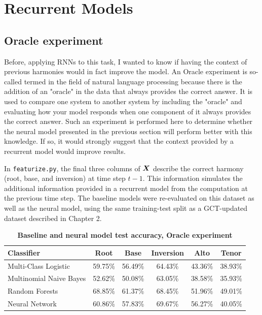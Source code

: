 \documentclass[11pt]{article}
\begin{document}
\section{Recurrent Models}

\subsection{Oracle experiment}

Before, applying RNNs to this task, I wanted to know if having the context of previous harmonies would in fact improve the model. An Oracle experiment is so-called termed in the field of natural language processing because there is the addition of an "oracle" in the data that always provides the correct answer. It is used to compare one system to another system by including the "oracle" and evaluating how your model responds when one component of it always provides the correct answer. Such an experiment is performed here to determine whether the neural model presented in the previous section will perform better with this knowledge. If so, it would strongly suggest that the context provided by a recurrent model would improve results.

In \texttt{featurize.py}, the final three columns of $\boldsymbol{X}$ describe the correct harmony (root, base, and inversion) at time step $t-1$. This information simulates the additional information provided in a recurrent model from the computation at the previous time step. The baseline models were re-evaluated on this dataset as well as the neural model, using the same training-test split as a GCT-updated dataset described in Chapter 2.

\begin{table}[h]
\begin{center}
\caption[Table caption text]{\textbf{Baseline and neural model test accuracy, Oracle experiment}}
\begin{tabular}{l *{5}{c}}
Classifier & Root & Base & Inversion & Alto & Tenor \\ \hline
Multi-Class Logistic & 59.75\% & 56.49\% & 64.43\% & 43.36\% & 38.93\% \\
Multinomial Naive Bayes & 52.62\% & 50.08\% & 63.05\% & 38.58\% & 35.93\% \\
Random Forests & 68.85\% & 61.37\% & 68.45\% & 51.96\% & 49.01\% \\ \hline
Neural Network & 60.86\% & 57.83\% & 69.67\% & 56.27\% & 40.05\% \\
\end{tabular}
\end{center}
\end{table}
\end{document}
